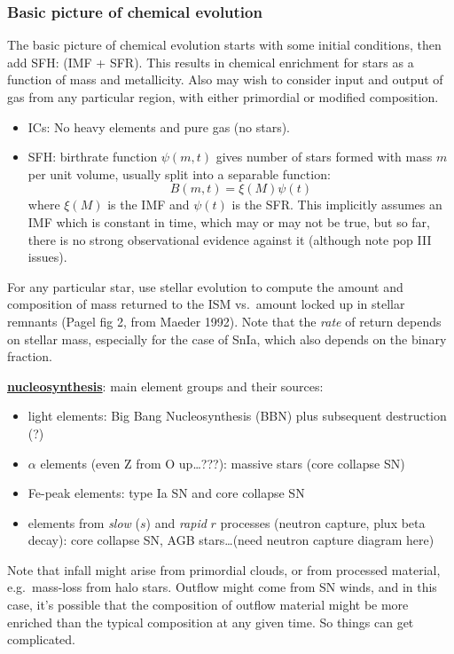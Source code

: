 \documentclass{article}
\newcommand{\mynotes}[1]{\textcolor{cadmiumgreen}{#1}}
\begin{document}
\subsubsection{Basic picture of chemical evolution}
The basic picture of chemical evolution starts with some initial conditions,
then add SFH: (IMF + SFR). This results in chemical enrichment for stars as a
function of mass and metallicity. Also may wish to consider input and output of
gas from any particular region, with either primordial or modified composition.
\begin{itemize}
    \item ICs: No heavy elements and pure gas (no stars).
    \item SFH: birthrate function $\psi(m,t)$ gives number of stars formed with
        mass $m$ per unit volume, usually split into a separable function:
        \[
            B(m,t) = \xi(M)\psi(t)
            \]
        where $\xi(M)$ is the IMF and $\psi(t)$ is the SFR\@. This implicitly
        assumes an IMF which is constant in time, which may or may not be true,
        but so far, there is no strong observational evidence against it
        (although note pop III issues).
\end{itemize}
For any particular star, use stellar evolution to compute the amount and
composition of mass returned to the ISM vs.\ amount locked up in stellar
remnants (Pagel fig 2, from Maeder 1992).  Note that the \emph{rate} of return
depends on stellar mass, especially for the case of SnIa, which also depends on
the binary fraction.

\textbf{\underline{nucleosynthesis}}: main element groups and their sources:
\begin{itemize}
    \item light elements: Big Bang Nucleosynthesis (BBN)
        plus subsequent destruction (?)
    \item $\alpha$ elements (even Z from O up\mynotes{\ldots???}):
        massive stars (core collapse SN)
    \item Fe-peak elements: type Ia SN and core collapse SN
    \item elements from \textit{slow} ($s$) and \textit{rapid} $r$ processes
        (neutron capture, plux beta decay):
        core collapse SN, AGB stars\ldots (need neutron capture diagram here)
\end{itemize}
Note that infall might arise from primordial clouds, or from processed
material, e.g.\ mass-loss from halo stars. Outflow might come from SN winds,
and in this case, it's possible that the composition of outflow material might
be more enriched than the typical composition at any given time. So things can
get complicated.
\end{document}
